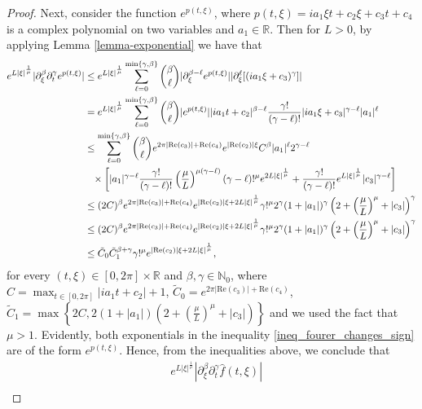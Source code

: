\documentclass[11pt,reqno]{amsart}
\numberwithin{equation}{section}
\theoremstyle{definition}
\theoremstyle{definition}
\newcommand{\R}{\mathbb{R}}
\newcommand{\N}{\mathbb{N}}
\newcommand{\Real}{\mathrm{Re}}
\begin{document}
\begin{proof}
    Next, consider the function $e^{p(t,\xi)}$, where $p(t,\xi)=ia_1\xi t+c_2\xi + c_3t+c_4$ is a complex polynomial on two variables and $a_1\in\R$. Then for $L>0$, by applying Lemma \ref{lemma-exponential} we have that
        \begin{align}
          e^{L|\xi|^{\frac{1}{\mu}}}|\partial_\xi^{\beta}\partial_t^\gamma e^{p(t,\xi)}|
          &\leq  e^{L|\xi|^{\frac{1}{\mu}}}\sum_{\ell=0}^{\min\{\gamma,\beta\}}\binom{\beta}{\ell}|\partial_{\xi}^{\beta-\ell}e^{p(t,\xi)}||\partial_\xi^\ell[(ia_1\xi +c_3)^\gamma]|\notag\\
         &= e^{L|\xi|^{\frac{1}{\mu}}}\sum_{\ell=0}^{\min\{\gamma,\beta\}}\binom{\beta}{\ell}|e^{p(t,\xi)}||ia_1t+c_2|^{\beta-\ell}\frac{\gamma!}{(\gamma-\ell)!}|ia_1\xi +c_3|^{\gamma-\ell}|a_1|^\ell\notag\\
         &\leq \sum_{\ell=0}^{\min\{\gamma,\beta\}}\binom{\beta}{\ell} e^{2\pi|\Real(c_3)|+\Real(c_4)}e^{|\Real(c_2)|\xi}C^{\beta}|a_1|^\ell2^{\gamma-\ell}\notag\\
         &\phantom{\geq} \times\left[|a_1|^{\gamma-\ell}\frac{\gamma!}{(\gamma-\ell)!}\left(\frac{\mu}{L}\right)^{\mu(\gamma-\ell)}(\gamma-\ell)!^\mu e^{2L|\xi|^{\frac{1}{\mu}}}+\frac{\gamma!}{(\gamma-\ell)!}e^{L|\xi|^{\frac{1}{\mu}}}|c_3|^{\gamma-\ell}\right]\notag\\
         &\leq (2C)^\beta e^{2\pi|\Real(c_3)|+\Real(c_4)}e^{|\Real(c_2)|\xi+2L|\xi|^{\frac{1}{\mu}}}\gamma!^{\mu}2^{\gamma}(1+|a_1|)^\gamma\left(2+\left(\frac{\mu}{L}\right)^{\mu}+|c_3|\right)^\gamma \notag\\
         &\leq  (2C)^\beta e^{2\pi|\Real(c_3)|+\Real(c_4)}e^{|\Real(c_2)|\xi+2L|\xi|^{\frac{1}{\mu}}}\gamma!^{\mu}2^{\gamma}(1+|a_1|)^\gamma\left(2+\left(\frac{\mu}{L}\right)^{\mu}+|c_3|\right)^\gamma\notag\\
         & \leq \tilde{C}_0\tilde{C}_1^{\beta+\gamma}\gamma!^{\mu}e^{|\Real(c_2)|\xi+2L|\xi|^{\frac{1}{\mu}}},\label{ineq_exp_poly}
    \end{align}
    for every $(t,\xi)\in [0,2\pi]\times\R$ and $\beta,\gamma\in\N_0$, where $C=\max_{t\in[0,2\pi]}|ia_1t+c_2|+1$, $\tilde{C}_0=e^{2\pi|\Real(c_3)|+\Real(c_4)}$, $\tilde{C}_1=\max\left\{2C,2(1+|a_1|)(2+(\frac{\mu}{L})^\mu+|c_3|)\right\}$ and we used the fact that $\mu> 1$. Evidently, both exponentials in the inequality \eqref{ineq_fourer_changes_sign} are of the form $e^{p(t,\xi)}$. Hence, from the inequalities above, we conclude that 
\begin{align*}
     &e^{L|\xi|^{\frac{1}{\mu}}}|\partial_\xi^\beta\partial_t^\gamma\widehat{f}(t,\xi)|\\

\end{align*}
\end{proof}
\end{document}
